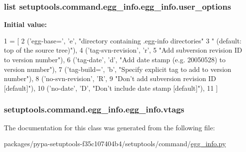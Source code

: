 \subsubsection[{user\+\_\+options}]{\setlength{\rightskip}{0pt plus 5cm}list setuptools.\+command.\+egg\+\_\+info.\+egg\+\_\+info.\+user\+\_\+options\hspace{0.3cm}{\ttfamily [static]}}\label{classsetuptools_1_1command_1_1egg__info_1_1egg__info_a77231052ffcc31b95fd27ea6747df6d6}
{\bfseries Initial value\+:}
\begin{DoxyCode}
1 = [
2         (\textcolor{stringliteral}{'egg-base='}, \textcolor{stringliteral}{'e'}, \textcolor{stringliteral}{"directory containing .egg-info directories"}
3                            \textcolor{stringliteral}{" (default: top of the source tree)"}),
4         (\textcolor{stringliteral}{'tag-svn-revision'}, \textcolor{stringliteral}{'}\textcolor{stringliteral}{r',}
5 \textcolor{stringliteral}{         }\textcolor{stringliteral}{"Add subversion revision ID to version number"}),
6         (\textcolor{stringliteral}{'tag-date'}, \textcolor{stringliteral}{'d'}, \textcolor{stringliteral}{"Add date stamp (e.g. 20050528) to version number"}),
7         (\textcolor{stringliteral}{'tag-build='}, \textcolor{stringliteral}{'b'}, \textcolor{stringliteral}{"Specify explicit tag to add to version number"}),
8         (\textcolor{stringliteral}{'no-svn-revision'}, \textcolor{stringliteral}{'}\textcolor{stringliteral}{R',}
9 \textcolor{stringliteral}{         }\textcolor{stringliteral}{"Don't add subversion revision ID [default]"}),
10         (\textcolor{stringliteral}{'no-date'}, \textcolor{stringliteral}{'D'}, \textcolor{stringliteral}{"Don't include date stamp [default]"}),
11     ]
\end{DoxyCode}
\hypertarget{classsetuptools_1_1command_1_1egg__info_1_1egg__info_a6c099c7db571c1095cccb67288b2da66}{}
\subsubsection[{vtags}]{\setlength{\rightskip}{0pt plus 5cm}setuptools.\+command.\+egg\+\_\+info.\+egg\+\_\+info.\+vtags}\label{classsetuptools_1_1command_1_1egg__info_1_1egg__info_a6c099c7db571c1095cccb67288b2da66}


The documentation for this class was generated from the following file\+:\begin{DoxyCompactItemize}
\item 
packages/pypa-\/setuptools-\/f35c107404b4/setuptools/command/\hyperlink{egg__info_8py}{egg\+\_\+info.\+py}\end{DoxyCompactItemize}
